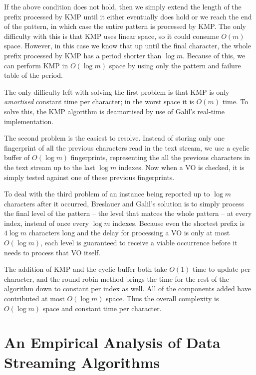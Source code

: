 \documentclass[ %
                    author={Dominic Joseph Moylett},
                    degree={MEng},
                     title={Dictionary Matching with Fingerprints},
                  subtitle={An Empirical Analysis},
                      type={research},
                      year={2015} ]{dissertation}
\begin{document}
If the above condition does not hold, then we simply extend the length of the prefix processed by KMP until it either eventually does hold or we reach the end of the pattern, in which case the entire pattern is processed by KMP. The only difficulty with this is that KMP uses linear space, so it could consume $O(m)$ space. However, in this case we know that up until the final character, the whole prefix processed by KMP has a period shorter than $\log m$. Because of this, we can perform KMP in $O(\log m)$ space by using only the pattern and failure table of the period.

The only difficulty left with solving the first problem is that KMP is only \textit{amortised} constant time per character; in the worst space it is $O(m)$ time. To solve this, the KMP algorithm is deamortised by use of Galil's \cite{Galil:1981:SMR:322234.322244} real-time implementation.

The second problem is the easiest to resolve. Instead of storing only one fingerprint of all the previous characters read in the text stream, we use a cyclic buffer of $O(\log m)$ fingerprints, representing the all the previous characters in the text stream up to the last $\log m$ indexes. Now when a VO is checked, it is simply tested against one of these previous fingerprints.

To deal with the third problem of an instance being reported up to $\log m$ characters after it occurred, Breslauer and Galil's solution is to simply process the final level of the pattern  --  the level that matces the whole pattern  --  at every index, instead of once every $\log m$ indexes. Because even the shortest prefix is $4\log m$ characters long and the delay for processing a VO is only at most $O(\log m)$, each level is guaranteed to receive a viable occurrence before it needs to process that VO itself.

The addition of KMP and the cyclic buffer both take $O(1)$ time to update per character, and the round robin method brings the time for the rest of the algorithm down to constant per index as well. All of the components added have contributed at most $O(\log m)$ space. Thus the overall complexity is $O(\log m)$ space and constant time per character.

\section{An Empirical Analysis of Data Streaming Algorithms}
\label{sec:summer}
\end{document}
